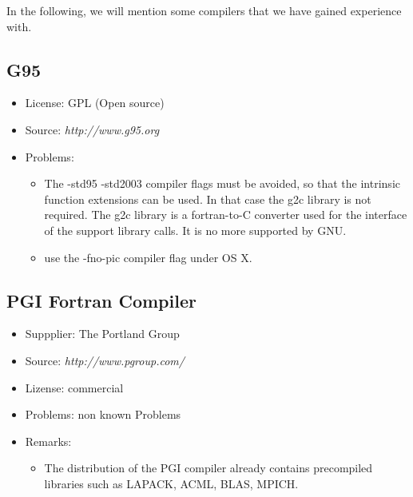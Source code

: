 \documentclass[a4paper,10pt]{report}
\begin{document}
In the following, we will mention some compilers that we have gained
experience with.
 
\subsection{G95}
\label{sec:g95}
\begin{itemize}
\item License: GPL (Open source)
\item Source: \textit{http://www.g95.org}
\item Problems: 
\begin{itemize}
\item The -std95 -std2003 compiler flags must be avoided, so that the
intrinsic function extensions can be used. In that case the g2c
library is not required. The g2c library is a fortran-to-C converter 
used for the interface of the support library calls. It is no more 
supported by GNU.
\item use the -fno-pic compiler flag under OS X.
\end{itemize}
\end{itemize}

\subsection{PGI Fortran Compiler}
\begin{itemize}
\item Suppplier: The Portland Group
\item Source: \textit{http://www.pgroup.com/}
\item Lizense: commercial
\item Problems: non known Problems
\item Remarks:
\begin{itemize}
\item The distribution of the PGI compiler already contains
precompiled libraries such as LAPACK, ACML, BLAS, MPICH.
\end{itemize}
\end{itemize}

\end{document}
